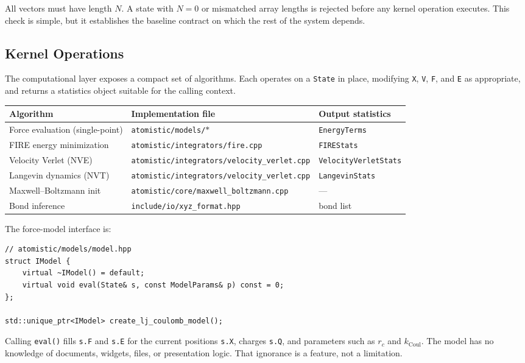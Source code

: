 ﻿\documentclass[11pt]{article}
\newcommand{\file}[1]{\texttt{#1}}
\newcommand{\type}[1]{\texttt{#1}}
\newcommand{\field}[1]{\texttt{#1}}
\newcommand{\op}[1]{\texttt{#1}}
\begin{document}
All vectors must have length $N$. A state with $N = 0$ or mismatched array
lengths is rejected before any kernel operation executes. This check is
simple, but it establishes the baseline contract on which the rest of the
system depends.
\subsection{Kernel Operations}

The computational layer exposes a compact set of algorithms. Each operates on a
\type{State} in place, modifying \field{X}, \field{V}, \field{F}, and
\field{E} as appropriate, and returns a statistics object suitable for the
calling context.

\begin{center}
\begin{tabular}{lll}
\toprule
Algorithm & Implementation file & Output statistics \\
\midrule
Force evaluation (single-point) & \file{atomistic/models/}$*$ & \type{EnergyTerms} \\
FIRE energy minimization & \file{atomistic/integrators/fire.cpp} & \type{FIREStats} \\
Velocity Verlet (NVE) & \file{atomistic/integrators/velocity\_verlet.cpp} & \type{VelocityVerletStats} \\
Langevin dynamics (NVT) & \file{atomistic/integrators/velocity\_verlet.cpp} & \type{LangevinStats} \\
Maxwell--Boltzmann init & \file{atomistic/core/maxwell\_boltzmann.cpp} & --- \\
Bond inference & \file{include/io/xyz\_format.hpp} & bond list \\
\bottomrule
\end{tabular}
\end{center}

The force-model interface is:

\begin{lstlisting}
// atomistic/models/model.hpp
struct IModel {
    virtual ~IModel() = default;
    virtual void eval(State& s, const ModelParams& p) const = 0;
};

std::unique_ptr<IModel> create_lj_coulomb_model();
\end{lstlisting}

Calling \op{eval()} fills \field{s.F} and \field{s.E} for the current
positions \field{s.X}, charges \field{s.Q}, and parameters such as $r_c$ and
$k_{\mathrm{Coul}}$. The model has no knowledge of documents, widgets, files,
or presentation logic. That ignorance is a feature, not a limitation.
\end{document}
